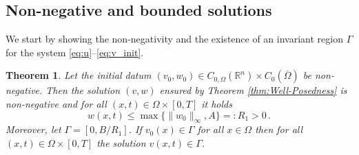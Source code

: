 \documentclass[11pt, a4paper]{article}
\theoremstyle{break}
\newtheorem{thm}{Theorem}[section]
\theoremstyle{break}
\theoremstyle{break}
\theoremstyle{break}
\theoremstyle{break}
\theoremstyle{break}
\theoremstyle{break}
\theoremstyle{break}
\theoremstyle{break}
\theoremstyle{break}
\begin{document}
\subsection{Non-negative and bounded solutions} 
We start by showing the non-negativity and the existence of an invariant region $\Gamma$ for the system \eqref{eq:u}--\eqref{eq:v_init}.
\begin{thm}
    \label{thm:Non-negativity}
     Let the initial datum $(v_0, w_0) \in C_{0, \Omega}(\mathbb{R}^n) \times C_0(\overline{\Omega})$ be non-negative. Then the solution $(v, w)$ ensured by Theorem \ref{thm:Well-Posedness} is non-negative and for all $(x, t) \in \Omega \times [0, T]$ it holds
     \begin{equation}
         w(x,t) \leq \max\{\|w_0\|_\infty, A\} =: R_1 >0\,.
     \end{equation}
     Moreover, let $\Gamma = [0, B/R_1]$. If  $v_0(x) \in \Gamma$ for all $x \in \Omega$ then for all $(x, t) \in \Omega \times [0, T]$ the solution $v(x,t) \in \Gamma$.
\end{thm}
\end{document}
